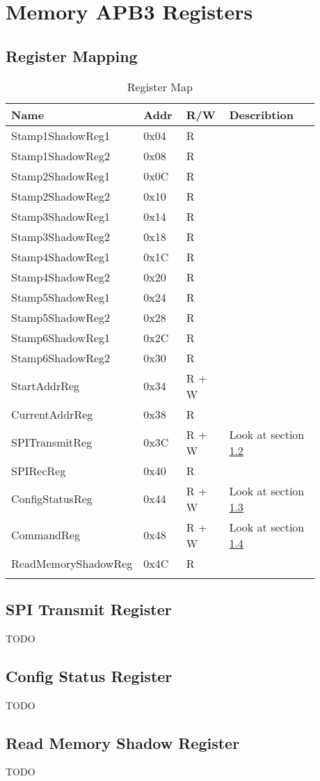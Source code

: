
\section{Memory APB3 Registers}
\subsection{Register Mapping}
\label{sec:apbRegDec}
\renewcommand{\arraystretch}{1.5}
\begin{longtable} [htb] { |p{0.3\linewidth}|p{0.14\linewidth}|p{0.14\linewidth}|p{0.3\linewidth}| } \hline
	\label{tab:table3}
	\textbf{Name} & \textbf{Addr}& \textbf{R/W}&\textbf{Describtion}\\
	\hline
	Stamp1ShadowReg1&0x04&R&\\
	\hline
	Stamp1ShadowReg2&0x08&R&\\
	\hline
	Stamp2ShadowReg1&0x0C&R&\\
	\hline
	Stamp2ShadowReg2&0x10&R&\\
	\hline
	Stamp3ShadowReg1&0x14&R&\\
	\hline
	Stamp3ShadowReg2&0x18&R&\\
	\hline
	Stamp4ShadowReg1&0x1C&R&\\
	\hline
	Stamp4ShadowReg2&0x20&R&\\
	\hline
	Stamp5ShadowReg1&0x24&R&\\
	\hline
	Stamp5ShadowReg2&0x28&R&\\
	\hline
	Stamp6ShadowReg1&0x2C&R&\\
	\hline
	Stamp6ShadowReg2&0x30&R&\\
	\hline
	StartAddrReg&0x34&R + W&\\
	\hline
	CurrentAddrReg&0x38&R&\\
	\hline
	SPITransmitReg&0x3C&R + W& Look at section \ref{sec:SPITxReg} \\
	\hline
	SPIRecReg&0x40&R&\\
	\hline
	ConfigStatusReg&0x44&R + W& Look at section \ref{sec:ConStReg}\\
	\hline
	CommandReg&0x48&R + W& Look at section \ref{sec:RMShadowReg}\\
	\hline
	ReadMemoryShadowReg&0x4C&R&\\
	\hline
\caption{Register Map}
\end{longtable}
\renewcommand{\arraystretch}{1.0}
\subsection{SPI Transmit Register} 
\label{sec:SPITxReg}
TODO
\subsection{Config Status Register} 
\label{sec:ConStReg}
TODO
\subsection{Read Memory Shadow Register} 
\label{sec:RMShadowReg}
TODO

	